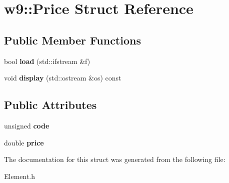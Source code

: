 \hypertarget{structw9_1_1Price}{}\section{w9\+:\+:Price Struct Reference}
\label{structw9_1_1Price}
\subsection*{Public Member Functions}
\begin{DoxyCompactItemize}
\item 
\mbox{\label{structw9_1_1Price_ac255fd6d3fe72581fa987934bc4f0c53}} 
bool {\bfseries load} (std\+::ifstream \&f)
\item 
\mbox{\label{structw9_1_1Price_a9ac88f2eb6aaa3d0bea1fd2dac2cba60}} 
void {\bfseries display} (std\+::ostream \&os) const
\end{DoxyCompactItemize}
\subsection*{Public Attributes}
\begin{DoxyCompactItemize}
\item 
\mbox{\label{structw9_1_1Price_ac005ee99b04e13a62ebcb644fe0084a1}} 
unsigned {\bfseries code}
\item 
\mbox{\label{structw9_1_1Price_aca9387f95335e5c552c203d35329a9d4}} 
double {\bfseries price}
\end{DoxyCompactItemize}


The documentation for this struct was generated from the following file\+:\begin{DoxyCompactItemize}
\item 
Element.\+h\end{DoxyCompactItemize}
